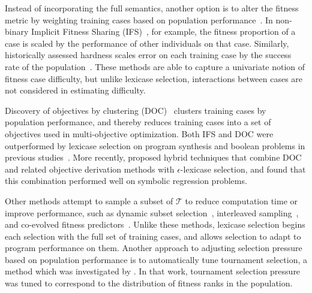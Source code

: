 \documentclass[twoside]{article}
\newcommand{\edit}[1]{{\color{red} #1}}
\begin{document}
Instead of incorporating the full semantics, another option is to alter the fitness metric by weighting training cases based on population performance~\citep{mckay_investigation_2001}. In non-binary Implicit Fitness Sharing (IFS)~\citep{krawiec_implicit_2013}, for example, the fitness proportion of a case is scaled by the performance of other individuals on that case. Similarly, historically assessed hardness scales error on each training case by the success rate of the population~\citep{klein_genetic_2008}. \edit{These methods are able to capture a univariate notion of fitness case difficulty, but unlike lexicase selection, interactions between cases are not considered in estimating difficulty.}

Discovery of objectives by clustering (DOC)~\citep{krawiec_automatic_2015} clusters training cases by population performance, and thereby reduces training cases into a set of objectives used in multi-objective optimization. Both IFS and DOC were outperformed by lexicase selection on program synthesis and boolean problems in previous studies~\citep{helmuth_general_2015-1,liskowski_comparison_2015}. \edit{More recently, \cite{liskowski_discovery_2017} proposed hybrid techniques that combine DOC and related objective derivation methods with $\epsilon$-lexicase selection, and found that this combination performed well on symbolic regression problems.} 

Other methods attempt to sample a subset of $\mathcal{T}$ to reduce computation time or improve performance, such as dynamic subset selection~\citep{gathercole_dynamic_1994}, interleaved sampling~\citep{goncalves_balancing_2013}, and co-evolved fitness predictors~\citep{schmidt_coevolution_2008}. Unlike these methods, lexicase selection begins each selection with the full set of training cases, and allows selection to adapt to program performance on them.
\edit{
Another approach to adjusting selection pressure based on population performance is to automatically tune tournament selection, a method which was investigated by \cite{xie_parent_2013}. In that work, tournament selection pressure was tuned to correspond to the distribution of fitness ranks in the population. 
}
\end{document}
